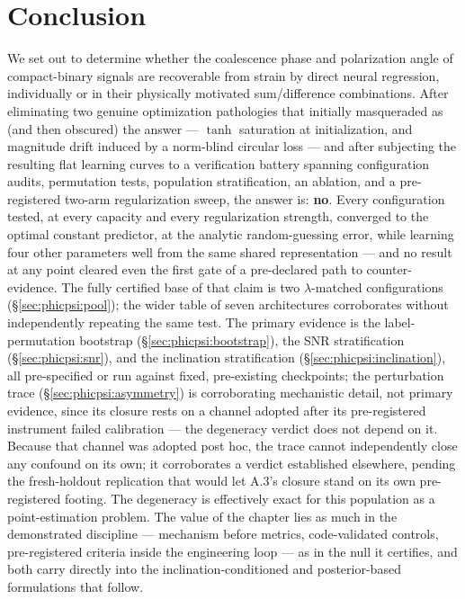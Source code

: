 \section{Conclusion}
\label{sec:phicpsi:conclusion}

We set out to determine whether the coalescence phase and polarization angle of compact-binary signals are recoverable from strain by direct neural regression, individually or in their physically motivated sum/difference combinations.
After eliminating two genuine optimization pathologies that initially masqueraded as (and then obscured) the answer --- $\tanh$ saturation at initialization, and magnitude drift induced by a norm-blind circular loss --- and after subjecting the resulting flat learning curves to a verification battery spanning configuration audits, permutation tests, population stratification, an ablation, and a pre-registered two-arm regularization sweep, the answer is: \textbf{no}.
Every configuration tested, at every capacity and every regularization strength, converged to the optimal constant predictor, at the analytic random-guessing error, while learning four other parameters well from the same shared representation --- and no result at any point cleared even the first gate of a pre-declared path to counter-evidence.
The fully certified base of that claim is two $\lambda$-matched configurations (\S\ref{sec:phicpsi:pool}); the wider table of seven architectures corroborates without independently repeating the same test.
The primary evidence is the label-permutation bootstrap (\S\ref{sec:phicpsi:bootstrap}), the SNR stratification (\S\ref{sec:phicpsi:snr}), and the inclination stratification (\S\ref{sec:phicpsi:inclination}), all pre-specified or run against fixed, pre-existing checkpoints; the perturbation trace (\S\ref{sec:phicpsi:asymmetry}) is corroborating mechanistic detail, not primary evidence, since its closure rests on a channel adopted after its pre-registered instrument failed calibration --- the degeneracy verdict does not depend on it.
Because that channel was adopted post hoc, the trace cannot independently close any confound on its own; it corroborates a verdict established elsewhere, pending the fresh-holdout replication that would let A.3's closure stand on its own pre-registered footing.
The degeneracy is effectively exact for this population as a point-estimation problem.
The value of the chapter lies as much in the demonstrated discipline --- mechanism before metrics, code-validated controls, pre-registered criteria inside the engineering loop --- as in the null it certifies, and both carry directly into the inclination-conditioned and posterior-based formulations that follow.


